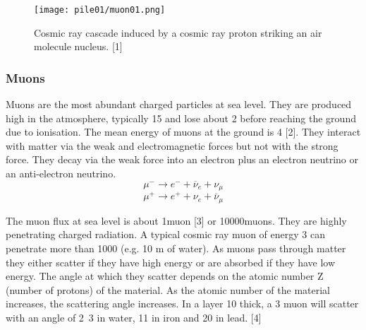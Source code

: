 \documentclass[twoside,titlepage,11pt,twocolumn,a4paper]{article}
\begin{document}
\begin{figure}
  \texttt{[image: pile01/muon01.png]}
  \caption{Cosmic ray cascade induced by a cosmic ray proton striking
    an air molecule nucleus. [1]}
\end{figure}

\subsubsection{Muons}
Muons are the most abundant charged particles at sea level. They are
produced high in the atmosphere, typically \unit{15}{\kilo\metre} and
lose about \unit{2}{\giga\electronvolt} before reaching the ground due
to ionisation. The mean energy of muons at the ground is
\unit{4}{\giga\electronvolt} [2]. They interact with matter via the
weak and electromagnetic forces but not with the strong force. They
decay via the weak force into an electron plus an electron neutrino or
an anti-electron neutrino.
\begin{equation} \mu^- \rightarrow e^- + \overline{\nu}_e + \nu_\mu \end{equation}
\begin{equation} \mu^+ \rightarrow e^+ + \nu_e + \overline{\nu}_\mu \end{equation}

The muon flux at sea level is about
\unit{1}{muon\usk\rpsquare{\centi\metre}\usk\reciprocal\minute} [3] or
\unit{10000}{muons\usk\rpsquare\metre\usk\reciprocal\minute}. They are
highly penetrating charged radiation.  A typical cosmic ray muon of
energy \unit{3}{\giga\electronvolt} can penetrate more than
\unit{1000}{\gram\usk\rpsquare{\centi\metre}} (e.g. 10 m of water). As
muons pass through matter they either scatter if they have high energy
or are absorbed if they have low energy. The angle at which they
scatter depends on the atomic number Z (number of protons) of the
material. As the atomic number of the material increases, the
scattering angle increases. In a layer \unit{10}{\centi\metre} thick,
a \unit{3}{\giga\electronvolt} muon will scatter with an angle of
\unit{2.3}{\milli\radian} in water, \unit{11}{\milli\radian} in iron
and \unit{20}{\milli\radian} in lead. [4]
\end{document}
